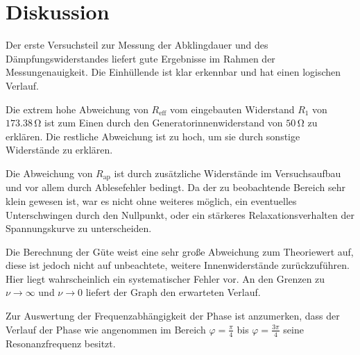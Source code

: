 \section{Diskussion}

Der erste Versuchsteil zur Messung der Abklingdauer und des Dämpfungswiderstandes liefert gute Ergebnisse im Rahmen der Messungenauigkeit.
Die Einhüllende ist klar erkennbar und hat einen logischen Verlauf. \par\bigskip
Die extrem hohe Abweichung von $R_\text{eff}$ vom eingebauten Widerstand $R_\text{1}$ von $173.38 \, \si{\ohm}$ ist zum Einen durch den
Generatorinnenwiderstand von $50 \, \si{\ohm}$ zu erklären. Die restliche Abweichung ist zu hoch, um sie durch sonstige Widerstände zu erklären.
\par\bigskip

Die Abweichung von $R_\text{ap}$ ist durch zusätzliche Widerstände im Versuchsaufbau und vor allem durch Ablesefehler bedingt.
Da der zu beobachtende Bereich sehr klein gewesen ist, war es nicht ohne weiteres möglich, ein eventuelles Unterschwingen durch den Nullpunkt,
oder ein stärkeres Relaxationsverhalten der Spannungskurve zu unterscheiden.
\par\bigskip

Die Berechnung der Güte weist eine sehr große Abweichung zum Theoriewert auf, diese ist jedoch nicht auf unbeachtete, weitere Innenwiderstände
zurückzuführen. Hier liegt wahrscheinlich ein systematischer Fehler vor. An den Grenzen zu $\nu\to\infty$ und $\nu\to 0$ liefert der Graph
den erwarteten Verlauf.
\par\bigskip

Zur Auswertung der Frequenzabhängigkeit der Phase ist anzumerken, dass der Verlauf der Phase wie angenommen im Bereich $\varphi = \frac{\pi}{4}$
bis $\varphi = \frac{3\pi}{4}$ seine Resonanzfrequenz besitzt.
